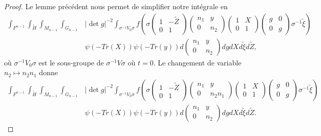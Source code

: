 \documentclass{amsart}
\begin{document}
\begin{proof}
Le lemme précédent nous permet de simplifier notre intégrale en
\begin{equation}
\begin{split}
\int_{F^{n-1}} \int_{\tilde{H}} \int_{M_{n-1}} \int_{G_{n-1}}  & |\det g|^{-2}\int_{\sigma^{-1}V_0\sigma} f\left(\sigma \begin{pmatrix}
1 & -\tilde{Z} \\
0 & 1
\end{pmatrix}  \begin{pmatrix}
n_1 & y \\
0 & n_2
\end{pmatrix} \begin{pmatrix}
1 & X \\
0 & 1
\end{pmatrix} \begin{pmatrix}
g & 0 \\
0 & g
\end{pmatrix} \sigma^{-1} \tilde{\xi}\right) \\
& \psi(-Tr(X)) \psi(-Tr(y))  d\begin{pmatrix}
n_1 & y \\
0 & n_2
\end{pmatrix} dg dX d\tilde{\xi} d\tilde{Z},
\end{split}
\end{equation}
où $\sigma^{-1}V_0\sigma$ est le sous-groupe de $\sigma^{-1}V\sigma$ où $t=0$. Le changement de variable $n_2 \mapsto n_2n_1$ donne
\begin{equation}
\begin{split}
\int_{F^{n-1}} \int_{\tilde{H}} \int_{M_{n-1}} \int_{G_{n-1}}  &|\det g|^{-2}\int_{\sigma^{-1}V_0\sigma} f\left(\sigma \begin{pmatrix}
1 & -\tilde{Z} \\
0 & 1
\end{pmatrix}  \begin{pmatrix}
n_1 & y \\
0 & n_2n_1
\end{pmatrix} \begin{pmatrix}
1 & X \\
0 & 1
\end{pmatrix} \begin{pmatrix}
g & 0 \\
0 & g
\end{pmatrix} \sigma^{-1} \tilde{\xi}\right) \\
& \psi(-Tr(X)) \psi(-Tr(y))  d\begin{pmatrix}
n_1 & y \\
0 & n_2
\end{pmatrix} dg dX d\tilde{\xi} d\tilde{Z}.
\end{split}
\end{equation}


\end{proof}
\end{document}

